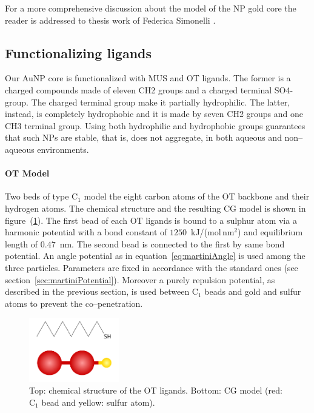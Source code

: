 For a more comprehensive discussion about the model of the \ac{NP} gold core the reader is addressed to thesis work of Federica Simonelli \cite{simonelliThesis}.


\subsection{Functionalizing ligands}
Our Au\ac{NP} core is functionalized with \ac{MUS} and \ac{OT} ligands. The former is a charged compounds made of eleven \ac{CH2} groups and a charged terminal \ac{SO4-} group. The charged terminal group make it partially hydrophilic. The latter, instead, is completely hydrophobic and it is made by seven \ac{CH2} groups and one \ac{CH3} terminal group. Using both hydrophilic and hydrophobic groups guarantees that such \acp{NP} are stable, that is, does not aggregate, in both aqueous and non--aqueous environments.

\paragraph{\textbf{OT Model}} Two \martini beds of type C$_1$ model the eight carbon atoms of the \ac{OT} backbone and their hydrogen atoms. The chemical structure and the resulting \ac{CG} \martini model is shown in figure~(\ref{fig:ot}). The first bead of each \ac{OT} ligands is bound to a sulphur atom via a harmonic potential with a bond constant of $1250$~kJ/(mol\,nm$^2$) and equilibrium length of $0.47$~nm. The second bead is connected to the first by same bond potential. An angle potential as in equation~\eqref{eq:martiniAngle} is used among the three particles. Parameters are fixed in accordance with the standard \martini ones (see section~\ref{sec:martiniPotential}). Moreover a purely repulsion potential, as described in the previous section, is used between C$_1$ beads and gold and sulfur atoms to prevent the co--penetration.
\begin{figure}
	\includegraphics[width=0.35\textwidth]{./img/OT/OT}
	\caption{Top: chemical structure of the \acs{OT} ligands. Bottom: \acs{CG} \martini model (red: C$_1$ bead and yellow: sulfur atom).}
	\label{fig:ot}
\end{figure}

